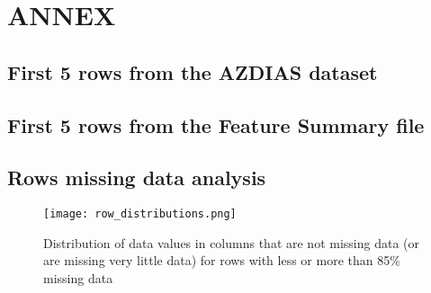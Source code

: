 \section{ANNEX}\label{ANNEX}

\subsection{First 5 rows from the AZDIAS dataset}



\subsection{First 5 rows from the Feature Summary file}


\subsection{Rows missing data analysis}
\begin{figure}[h]
\centering
\texttt{[image: row\_distributions.png]}
\caption{Distribution of data values in columns that are not missing data (or are missing very little data) for rows with less or more than 85\% missing data}
\label{fig:row_distributions}
\end{figure}